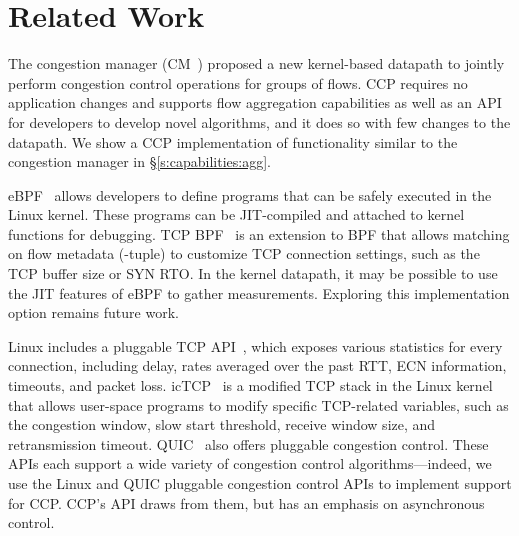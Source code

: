 \section{Related Work}
\label{s:relwork}
The congestion manager (CM~\cite{cm}) proposed a new kernel-based datapath to jointly perform congestion control operations for groups of flows. CCP requires no application changes and supports flow aggregation capabilities as well as an API for developers to develop novel algorithms, and it does so with few changes to the datapath. We show a CCP implementation of functionality similar to the congestion manager in \S\ref{s:capabilities:agg}.

eBPF~\cite{ebpf} allows developers to define programs that can be safely executed in the Linux kernel. These programs can be JIT-compiled and attached to kernel functions for debugging. TCP BPF~\cite{tcpbpf} is an extension to BPF that allows matching on flow metadata (-tuple) to customize TCP connection settings, such as the TCP buffer size or SYN RTO.
In the kernel datapath, it may be possible to use the JIT features of eBPF to gather measurements.
Exploring this implementation option remains future work.

Linux includes a pluggable TCP API~\cite{lwn-pluggable-tcp}, which exposes various statistics for every connection, including delay, rates averaged over the past RTT, ECN information, timeouts, and packet loss.
icTCP~\cite{icTCP} is a modified TCP stack in the Linux kernel that allows user-space programs to modify specific TCP-related variables, such as the congestion window, slow start threshold, receive window size, and retransmission timeout. 
QUIC~\cite{quic} also offers pluggable congestion control. 
These APIs each support a wide variety of congestion control algorithms---indeed, we use the Linux and QUIC pluggable congestion control APIs to implement support for CCP. CCP's API draws from them, but has an emphasis on asynchronous control.

